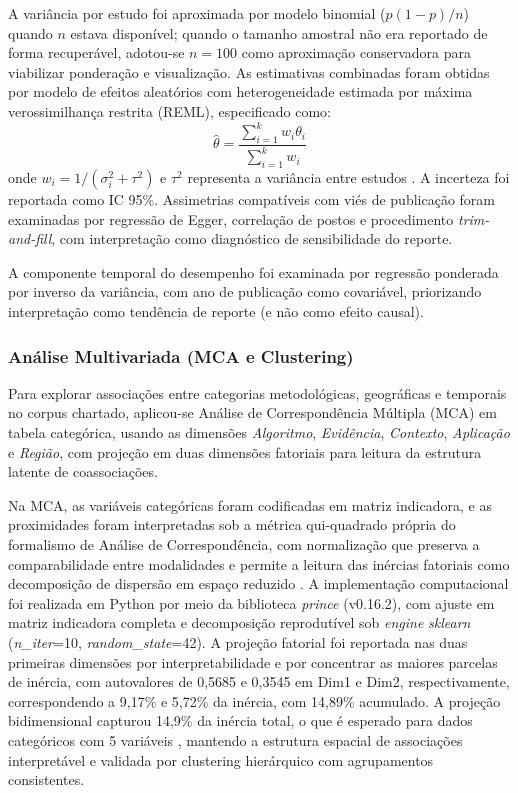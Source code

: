 A variância por estudo foi aproximada por modelo binomial ($p(1-p)/n$) quando $n$ estava disponível; quando o tamanho amostral não era reportado de forma recuperável, adotou-se $n=100$ como aproximação conservadora para viabilizar ponderação e visualização. As estimativas combinadas foram obtidas por modelo de efeitos aleatórios com heterogeneidade estimada por máxima verossimilhança restrita (REML), especificado como:
\begin{equation}
\hat{\theta} = \frac{\sum_{i=1}^{k} w_i \theta_i}{\sum_{i=1}^{k} w_i}
\end{equation}
onde $w_i = 1/(\sigma_i^2 + \tau^2)$ e $\tau^2$ representa a variância entre estudos \cite{Viechtbauer2010}. A incerteza foi reportada como IC 95\%. Assimetrias compatíveis com viés de publicação foram examinadas por regressão de Egger, correlação de postos e procedimento \textit{trim-and-fill}, com interpretação como diagnóstico de sensibilidade do reporte.

A componente temporal do desempenho foi examinada por regressão ponderada por inverso da variância, com ano de publicação como covariável, priorizando interpretação como tendência de reporte (e não como efeito causal).

\subsubsection[Análise Multivariada]{Análise Multivariada (MCA e Clustering)}

Para explorar associações entre categorias metodológicas, geográficas e temporais no corpus chartado, aplicou-se Análise de Correspondência Múltipla (MCA) em tabela categórica, usando as dimensões \textit{Algoritmo}, \textit{Evidência}, \textit{Contexto}, \textit{Aplicação} e \textit{Região}, com projeção em duas dimensões fatoriais para leitura da estrutura latente de coassociações.

Na MCA, as variáveis categóricas foram codificadas em matriz indicadora, e as proximidades foram interpretadas sob a métrica qui-quadrado própria do formalismo de Análise de Correspondência, com normalização que preserva a comparabilidade entre modalidades e permite a leitura das inércias fatoriais como decomposição de dispersão em espaço reduzido \cite{Greenacre2017,Abdi2014}. A implementação computacional foi realizada em Python por meio da biblioteca \textit{prince} (v0.16.2), com ajuste em matriz indicadora completa e decomposição reprodutível sob \textit{engine} \textit{sklearn} (\textit{n\_iter}=10, \textit{random\_state}=42). A projeção fatorial foi reportada nas duas primeiras dimensões por interpretabilidade e por concentrar as maiores parcelas de inércia, com autovalores de 0,5685 e 0,3545 em Dim1 e Dim2, respectivamente, correspondendo a 9,17\% e 5,72\% da inércia, com 14,89\% acumulado. A projeção bidimensional capturou 14,9\% da inércia total, o que é esperado para dados categóricos com 5 variáveis \cite{Greenacre2017}, mantendo a estrutura espacial de associações interpretável e validada por clustering hierárquico com agrupamentos consistentes.

